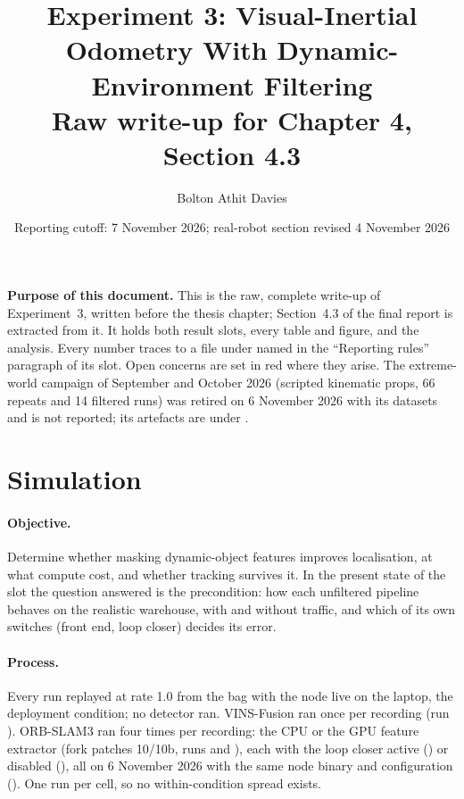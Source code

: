 \documentclass[11pt,a4paper,notitlepage]{report}
\title{Experiment 3: Visual-Inertial Odometry With Dynamic-Environment Filtering\\
       \large Raw write-up for Chapter 4, Section 4.3}
\author{Bolton Athit Davies}
\date{Reporting cutoff: 7 November 2026; real-robot section revised 4 November 2026}
\begin{document}
\maketitle

\noindent\textbf{Purpose of this document.} This is the raw, complete write-up
of Experiment~3, written before the thesis chapter; Section~4.3 of the final
report is extracted from it. It holds both result slots, every table and
figure, and the analysis. Every number traces to a file under 
named in the ``Reporting rules'' paragraph of its slot. Open concerns are set
in red where they arise. The extreme-world campaign of September and October
2026 (scripted kinematic props, 66 repeats and 14 filtered runs) was retired
on 6 November 2026 with its datasets and is not reported; its artefacts are
under .

\FloatBarrier
\section{Simulation}
\label{sec:exp3-sim}


\paragraph{Objective.} Determine whether masking dynamic-object features
improves localisation, at what compute cost, and whether tracking survives it.
In the present state of the slot the question answered is the precondition:
how each unfiltered pipeline behaves on the realistic warehouse, with and
without traffic, and which of its own switches (front end, loop closer)
decides its error.

\paragraph{Process.} Every run replayed at rate 1.0 from the bag with the
node live on the laptop, the deployment condition; no detector ran. VINS-Fusion
ran once per recording (run ). ORB-SLAM3 ran four times per
recording: the CPU or the GPU feature extractor (fork patches 10/10b, runs
 and ), each with the loop closer active
() or disabled (), all on 6 November
2026 with the same node binary and configuration
(). One run per cell, so no
within-condition spread exists.
\end{document}
